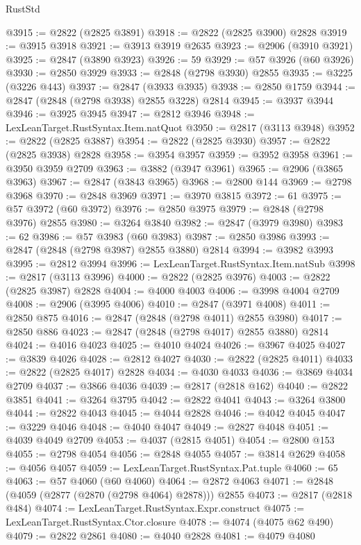 \begin{lexlean}{RustStd}
\begin{coremodule}
@3915 := @2822 (@2825 @3891)
@3918 := @2822 (@2825 @3900) @2828
@3919 := @3915 @3918
@3921 := @3913 @3919 @2635
@3923 := @2906 (@3910 @3921)
@3925 := @2847 (@3890 @3923)
@3926 := 59
@3929 := @57 @3926 (@60 @3926)
@3930 := @2850 @3929
@3933 := @2848 (@2798 @3930) @2855
@3935 := @3225 (@3226 @443)
@3937 := @2847 (@3933 @3935)
@3938 := @2850 @1759
@3944 := @2847 (@2848 (@2798 @3938) @2855 @3228) @2814
@3945 := @3937 @3944
@3946 := @3925 @3945
@3947 := @2812 @3946
@3948 := LexLeanTarget.RustSyntax.Item.natQuot
@3950 := @2817 (@3113 @3948)
@3952 := @2822 (@2825 @3887)
@3954 := @2822 (@2825 @3930)
@3957 := @2822 (@2825 @3938) @2828
@3958 := @3954 @3957
@3959 := @3952 @3958
@3961 := @3950 @3959 @2709
@3963 := @3882 (@3947 @3961)
@3965 := @2906 (@3865 @3963)
@3967 := @2847 (@3843 @3965)
@3968 := @2800 @144
@3969 := @2798 @3968
@3970 := @2848 @3969
@3971 := @3970 @3815
@3972 := 61
@3975 := @57 @3972 (@60 @3972)
@3976 := @2850 @3975
@3979 := @2848 (@2798 @3976) @2855
@3980 := @3264 @3840
@3982 := @2847 (@3979 @3980)
@3983 := 62
@3986 := @57 @3983 (@60 @3983)
@3987 := @2850 @3986
@3993 := @2847 (@2848 (@2798 @3987) @2855 @3880) @2814
@3994 := @3982 @3993
@3995 := @2812 @3994
@3996 := LexLeanTarget.RustSyntax.Item.natSub
@3998 := @2817 (@3113 @3996)
@4000 := @2822 (@2825 @3976)
@4003 := @2822 (@2825 @3987) @2828
@4004 := @4000 @4003
@4006 := @3998 @4004 @2709
@4008 := @2906 (@3995 @4006)
@4010 := @2847 (@3971 @4008)
@4011 := @2850 @875
@4016 := @2847 (@2848 (@2798 @4011) @2855 @3980)
@4017 := @2850 @886
@4023 := @2847 (@2848 (@2798 @4017) @2855 @3880) @2814
@4024 := @4016 @4023
@4025 := @4010 @4024
@4026 := @3967 @4025
@4027 := @3839 @4026
@4028 := @2812 @4027
@4030 := @2822 (@2825 @4011)
@4033 := @2822 (@2825 @4017) @2828
@4034 := @4030 @4033
@4036 := @3869 @4034 @2709
@4037 := @3866 @4036
@4039 := @2817 (@2818 @162)
@4040 := @2822 @3851
@4041 := @3264 @3795
@4042 := @2822 @4041
@4043 := @3264 @3800
@4044 := @2822 @4043
@4045 := @4044 @2828
@4046 := @4042 @4045
@4047 := @3229 @4046
@4048 := @4040 @4047
@4049 := @2827 @4048
@4051 := @4039 @4049 @2709
@4053 := @4037 (@2815 @4051)
@4054 := @2800 @153
@4055 := @2798 @4054
@4056 := @2848 @4055
@4057 := @3814 @2629
@4058 := @4056 @4057
@4059 := LexLeanTarget.RustSyntax.Pat.tuple
@4060 := 65
@4063 := @57 @4060 (@60 @4060)
@4064 := @2872 @4063
@4071 := @2848 (@4059 (@2877 (@2870 (@2798 @4064) @2878))) @2855
@4073 := @2817 (@2818 @484)
@4074 := LexLeanTarget.RustSyntax.Expr.construct
@4075 := LexLeanTarget.RustSyntax.Ctor.closure
@4078 := @4074 (@4075 @62 @490)
@4079 := @2822 @2861
@4080 := @4040 @2828
@4081 := @4079 @4080

\end{coremodule}
\end{lexlean}

